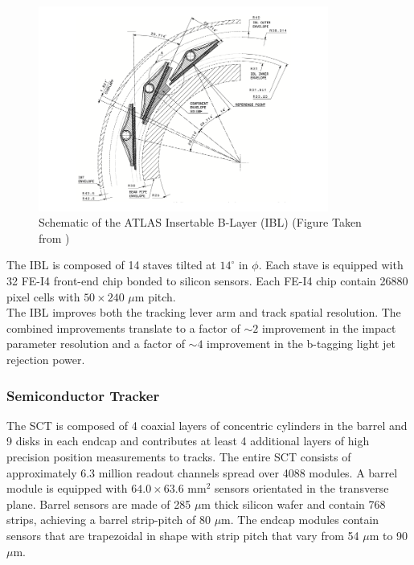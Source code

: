 \begin{figure}[h!]
\centering
\includegraphics[width=0.85\textwidth, angle=0]{figures/LHC_ATLAS/fig_ibl_layout_rev.png}
\caption[Schematic of the ATLAS Insertable B-Layer (IBL)]{ Schematic of the ATLAS Insertable B-Layer (IBL) (Figure Taken from \cite{IBLOverview}) \label{LHC:fig:IBL}}
\end{figure}

\indent The IBL is composed of 14 staves tilted at $14^{\circ}$ in $\phi$.  Each stave is equipped with 32 FE-I4 front-end chip bonded to silicon sensors. Each FE-I4 chip contain 26880 pixel cells with $50 \times 240$ $\mu$m pitch.\\

\indent The IBL improves both the tracking lever arm and track spatial resolution.  The combined improvements translate to a factor of $\sim2$ improvement in the impact parameter resolution and a factor of $\sim4$ improvement in the b-tagging light jet rejection power. \\

\subsubsection*{ Semiconductor Tracker}

\indent The SCT is composed of 4 coaxial layers of concentric cylinders in the barrel and 9 disks in each endcap and contributes at least 4 additional layers of high precision position measurements to tracks.  The entire SCT consists of approximately 6.3 million readout channels spread over 4088 modules.  A barrel module is equipped with $64.0 \times 63.6$ mm$^2$ sensors orientated in the transverse plane.  Barrel sensors are made of 285 $\mu$m thick silicon wafer and contain 768 strips, achieving a barrel strip-pitch of 80 $\mu$m.  The endcap modules contain sensors that are trapezoidal in shape with strip pitch that vary from 54 $\mu$m to 90 $\mu$m.  \\

